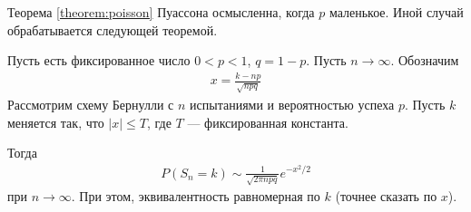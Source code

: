 \documentclass[../main.tex]{subfiles}
\begin{document}
Теорема \ref{theorem:poisson} Пуассона осмысленна, когда $p$ маленькое. Иной случай обрабатывается следующей теоремой.
\begin{thm}
 \label{theorem:local_theorem_muavr_laplas}
 Пусть есть фиксированное число $0 < p < 1$, $q = 1 - p$. Пусть $n \to \infty$. Обозначим
 \begin{align*}
  x =\frac{k - np}{\sqrt{npq}}
 \end{align*} Рассмотрим схему Бернулли с $n$ испытаниями и вероятностью успеха $p$.  Пусть $k$ меняется так, что $\left| x \right| \leqslant T$, где $T$ --- фиксированная константа.

 Тогда
 \begin{align*}
  P(S_n = k) \sim \frac{1}{\sqrt{2\pi npq }}e^{-x^{2} / 2}
 \end{align*} при $n \to \infty$. При этом, эквивалентность равномерная по $k$ (точнее сказать по $x$). 
\end{thm}
\end{document}
